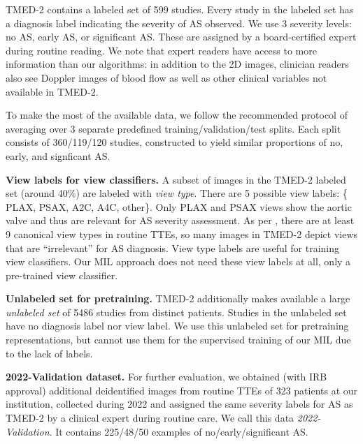TMED-2 contains a labeled set of 599 studies. Every study in the labeled set has a diagnosis label indicating the severity of AS observed. We use 3 severity levels: no AS, early AS, or significant AS.
These are assigned by a board-certified expert during routine reading. We note that expert readers have access to more information than our algorithms: in addition to the 2D images, clinician readers also see Doppler images of blood flow as well as other clinical variables not available in TMED-2.

To make the most of the available data, we follow the recommended protocol of averaging over 3 separate predefined training/validation/test splits. Each split consists of 360/119/120 studies, constructed to yield similar proportions of no, early, and signficant AS.

\textbf{View labels for view classifiers.}
A subset of images in the TMED-2 labeled set (around 40\%) are labeled with \emph{view type}. There are 5 possible view labels: \{ PLAX, PSAX, A2C, A4C, other\}. Only PLAX and PSAX views show the aortic valve and thus are relevant for AS severity assessment.
As per \citet{mitchell2019guidelines}, there are at least 9 canonical view types in routine TTEs, so many images in TMED-2 depict views that are ``irrelevant'' for AS diagnosis.
 View type labels are useful for training view classifiers.
Our MIL approach does not need these view labels at all, only a pre-trained view classifier.

\textbf{Unlabeled set for pretraining.}
TMED-2 additionally makes available a large \emph{unlabeled set} of 5486 studies from distinct patients. 
Studies in the unlabeled set have no diagnosis label nor view label.
We use this unlabeled set for pretraining representations, but cannot use them for the supervised training of our MIL due to the lack of labels.

\textbf{2022-Validation dataset.}
For further evaluation, we obtained (with IRB approval) additional deidentified images from routine TTEs of 323 patients at our institution, collected during 2022 and assigned the same severity labels for AS as TMED-2 by a clinical expert during routine care.
We call this data \emph{2022-Validation}. 
It contains 225/48/50 examples of no/early/significant AS.



